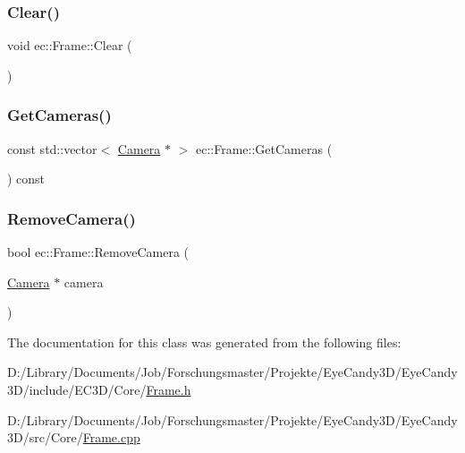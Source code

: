 \mbox{\label{classec_1_1_frame_a9756a68f9db16a43cf23dac3f13c0672}} 
\subsubsection{\texorpdfstring{Clear()}{Clear()}}
{\footnotesize\ttfamily void ec\+::\+Frame\+::\+Clear (\begin{DoxyParamCaption}{ }\end{DoxyParamCaption})}

\mbox{\label{classec_1_1_frame_ab0a5922f4be8a3565617418f447d4a5e}} 
\subsubsection{\texorpdfstring{Get\+Cameras()}{GetCameras()}}
{\footnotesize\ttfamily const std\+::vector$<$ \mbox{\hyperlink{classec_1_1_camera}{Camera}} $\ast$ $>$ ec\+::\+Frame\+::\+Get\+Cameras (\begin{DoxyParamCaption}{ }\end{DoxyParamCaption}) const}

\mbox{\label{classec_1_1_frame_a03d78a820026a27a6f18ec135283e22b}} 
\subsubsection{\texorpdfstring{Remove\+Camera()}{RemoveCamera()}}
{\footnotesize\ttfamily bool ec\+::\+Frame\+::\+Remove\+Camera (\begin{DoxyParamCaption}\item[{\mbox{\hyperlink{classec_1_1_camera}{Camera}} $\ast$}]{camera }\end{DoxyParamCaption})}



The documentation for this class was generated from the following files\+:\begin{DoxyCompactItemize}
\item 
D\+:/\+Library/\+Documents/\+Job/\+Forschungsmaster/\+Projekte/\+Eye\+Candy3\+D/\+Eye\+Candy3\+D/include/\+E\+C3\+D/\+Core/\mbox{\hyperlink{_frame_8h}{Frame.\+h}}\item 
D\+:/\+Library/\+Documents/\+Job/\+Forschungsmaster/\+Projekte/\+Eye\+Candy3\+D/\+Eye\+Candy3\+D/src/\+Core/\mbox{\hyperlink{_frame_8cpp}{Frame.\+cpp}}\end{DoxyCompactItemize}

